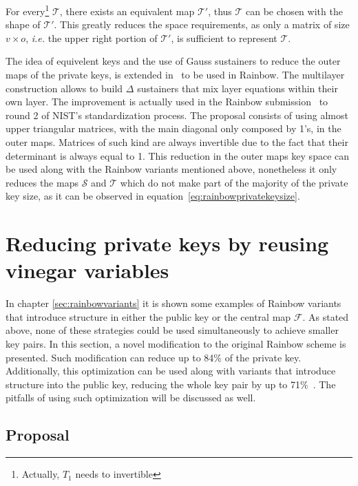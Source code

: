 \documentclass{ufsctex/ufsctex}
\begin{document}
For every\footnote{Actually, $T_1$ needs to invertible} $\mathcal{T}$, there
exists an equivalent map $\mathcal{T'}$, thus $\mathcal{T}$ can be chosen with
the shape of $\mathcal{T'}$. This greatly reduces the space requirements, as
only a matrix of size $v \times o$, \textit{i.e.} the upper right portion of
$\mathcal{T'}$, is sufficient to represent $\mathcal{T}$.

The idea of equivelent keys and the use of Gauss sustainers to reduce the outer
maps of the private keys, is extended in~\cite[Chapter 3.5]{petzoldt2013thesis}
to be used in Rainbow. The multilayer construction allows to build $\Delta$
sustainers that mix layer equations within their own layer. The improvement is
actually used in the Rainbow submission~\cite{ding2019nist} to round 2 of
NIST's standardization process. The proposal consists of using almost upper
triangular matrices, with the main diagonal only composed by 1's, in the outer
maps. Matrices of such kind are always invertible due to the fact that their
determinant is always equal to 1. This reduction in the outer maps key space
can be used along with the Rainbow variants mentioned above, nonetheless it
only reduces the maps $\mathcal{S}$ and $\mathcal{T}$ which do not make part of
the majority of the private key size, as it can be observed in
equation~\ref{eq:rainbowprivatekeysize}.

\chapter{Reducing private keys by reusing vinegar variables}

In chapter \ref{sec:rainbowvariants} it is shown some examples of Rainbow
variants that introduce structure in either the public key or the central map
$\mathcal{F}$. As stated above, none of these strategies could be used
simultaneously to achieve smaller key pairs. In this section, a novel
modification to the original Rainbow scheme is presented. Such modification can
reduce up to 84\% of the private key. Additionally, this optimization can be
used along with variants that introduce structure into the public key, reducing
the whole key pair by up to 71\%~\cite{zambonin2019handling}. The pitfalls of
using such optimization will be discussed as well.

\section{Proposal}\label{sec:proposal}
\end{document}
